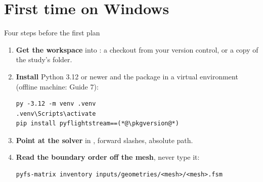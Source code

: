 %

\section{First time on Windows}

\begin{frame}[fragile]{Four steps before the first plan}
\begin{enumerate}
  \item \textbf{Get the workspace} into \code{\mainworkspace}: a checkout from
        your version control, or a copy of the study's folder.
  \item \textbf{Install} Python 3.12 or newer and the package in a virtual
        environment (offline machine: Guide 7):
\begin{lstlisting}[style=ftsbase]
py -3.12 -m venv .venv
.venv\Scripts\activate
pip install pyflightstream==(*@\pkgversion@*)
\end{lstlisting}
  \item \textbf{Point at the solver} in ,
        forward slashes, absolute path.
  \item \textbf{Read the boundary order off the mesh}, never type it:
\begin{lstlisting}[style=ftsbase]
pyfs-matrix inventory inputs/geometries/<mesh>/<mesh>.fsm
\end{lstlisting}
\end{enumerate}
\end{frame}


